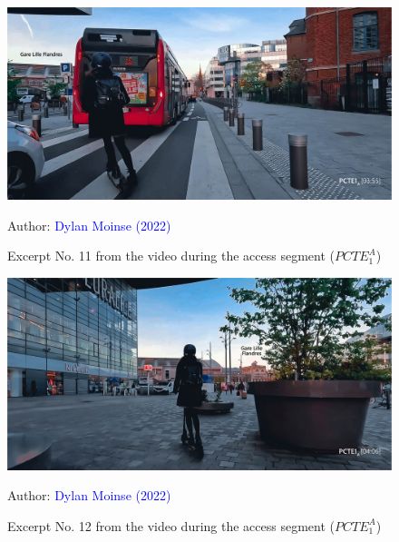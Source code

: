     \begin{figure}[h!]\vspace*{4pt}
        \caption*{Excerpt No. 11 from the video during the access segment (\(PCTE^{A}_{1}\))}
        \centerline{\includegraphics[width=0.75\columnwidth]{src/Figures/Annexes/Extrait_Video_PCTE1_Access_11.jpg}}
        \vspace{5pt}
        \begin{flushright}\scriptsize{
        Author: \textcolor{blue}{Dylan Moinse (2022)}
        }\end{flushright}
    \end{figure}

    \begin{figure}[h!]\vspace*{4pt}
        \caption*{Excerpt No. 12 from the video during the access segment (\(PCTE^{A}_{1}\))}
        \centerline{\includegraphics[width=0.75\columnwidth]{src/Figures/Annexes/Extrait_Video_PCTE1_Access_12.jpg}}
        \vspace{5pt}
        \begin{flushright}\scriptsize{
        Author: \textcolor{blue}{Dylan Moinse (2022)}
        }\end{flushright}
    \end{figure}

